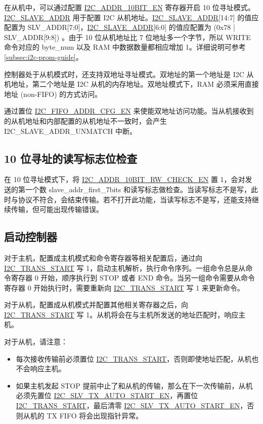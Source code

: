 \documentclass[main\_\_CN.tex]{subfiles}
\begin{document}
在从机中，可以通过配置 \hyperref[fielddesc:I2CADDR10BITEN]{I2C\_ADDR\_10BIT\_EN} 寄存器开启 10 位寻址模式。 \hyperref[fielddesc:I2CSLAVEADDR]{I2C\_SLAVE\_ADDR} 用于配置 I2C 从机地址。\hyperref[fielddesc:I2CSLAVEADDR]{I2C\_SLAVE\_ADDR}[14:7] 的值应配置为 SLV\_ADDR[7:0]，\hyperref[fielddesc:I2CSLAVEADDR]{I2C\_SLAVE\_ADDR}[6:0] 的值应配置为 (0x78 | SLV\_ADDR[9:8]) 。由于 10 位从机地址比 7 位地址多一个字节，所以 WRITE 命令对应的 byte\_num 以及 RAM 中数据数量都相应增加 1。详细说明可参考 \ref{subsec:i2c-prom-guide}。

控制器处于从机模式时，还支持双地址寻址模式。双地址的第一个地址是 I2C 从机地址，第二个地址是 I2C 从机的内存地址。双地址模式下，RAM 必须采用直接地址 (non-FIFO) 的方式访问。

通过置位 \hyperref[fielddesc:I2CFIFOADDRCFGEN]{I2C\_FIFO\_ADDR\_CFG\_EN} 来使能双地址访问功能。当从机接收到的从机地址和内部配置的从机地址不一致时，会产生 I2C\_SLAVE\_ADDR\_UNMATCH 中断。

\subsection{10 位寻址的读写标志位检查}

在 10 位寻址模式下，将 \hyperref[fielddesc:I2CADDR10BITRWCHECKEN]{I2C\_ADDR\_10BIT\_RW\_CHECK\_EN} 置 1，会对发送的第一个数 slave\_addr\_first\_7bits 和读写标志做检查。当读写标志不是写，此时与协议不符合，会结束传输。若不打开此功能，当读写标志不是写，还能支持继续传输，但可能出现传输错误。

\subsection{启动控制器}
\label{subsubsec:i2c-start}

对于主机，配置成主机模式和命令寄存器等相关配置后，通过向 \hyperref[fielddesc:I2CTRANSSTART]{I2C\_TRANS\_START} 写 1，启动主机解析，执行命令序列。一组命令总是从命令寄存器 0 开始，顺序执行到 STOP 或者 END 命令。当另一组命令需要从命令寄存器 0 开始执行时，需要重新向 \hyperref[fielddesc:I2CTRANSSTART]{I2C\_TRANS\_START} 写 1 来更新命令。

对于从机，配置成从机模式并配置其他相关寄存器之后，向 \hyperref[fielddesc:I2CTRANSSTART]{I2C\_TRANS\_START} 写 1。从机将会在与主机所发送的地址匹配时，响应主机。

对于从机，请注意：

\begin{itemize}
    \item 每次接收传输前必须置位 \hyperref[fielddesc:I2CTRANSSTART]{I2C\_TRANS\_START}，否则即使地址匹配，从机也不会响应主机。
    \item 如果主机发起 STOP 提前中止了和从机的传输，那么在下一次传输前，从机必须先置位 \hyperref[fielddesc:I2CSLVTXAUTOSTARTEN]{I2C\_SLV\_TX\_AUTO\_START\_EN}，再置位 \hyperref[fielddesc:I2CTRANSSTART]{I2C\_TRANS\_START}，最后清零 \hyperref[fielddesc:I2CSLVTXAUTOSTARTEN]{I2C\_SLV\_TX\_AUTO\_START\_EN}，否则从机的 TX FIFO 将会出现指针异常。
\end{itemize}
\end{document}
